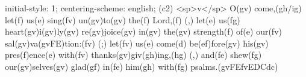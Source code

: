 initial-style: 1;
centering-scheme: english;
(c2) <sp>v</sp> O(gv) come,(gh/ig) let(f) us(e) sing(fv) un(gv)to(gv) the(f) Lord,(f) (,) let(e) us(fg) heart(gv)i(gv)ly(gv) re(gv)joice(gv) in(gv) the(gv) strength(f) of(e) our(fv) sal(gv)va(gvFE)tion:(fv) (;) let(fv) us(e) come(d) be(ef)fore(gv) his(gv) pres(f)ence(e) with(fv) thanks(gv)giv(gh)ing,(hg) (,) and(fe) shew(fg) our(gv)selves(gv) glad(gf) in(fe) him(gh) with(fg) psalms.(gvFEfvEDCdc)
